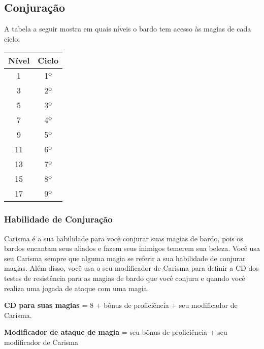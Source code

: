 \begin{multicols}{2}
\section*{Conjuração}%

A tabela a seguir mostra em quais níveis o bardo tem acesso às magias de cada
ciclo:

\begin{center}
\begin{tabular}{|||c||c|||}
    \hline
    \textbf{Nível} & \textbf{Ciclo} \\
    \hline
    1 & 1º \\
    \hline
    3 & 2º \\
    \hline
    5 & 3º \\
    \hline
    7 & 4º \\
    \hline
    9 & 5º \\
    \hline
    11 & 6º \\
    \hline
    13 & 7º \\
    \hline
    15 & 8º \\
    \hline
    17 & 9º \\
    \hline
\end{tabular}
\end{center}

\subsubsection*{Habilidade de Conjuração}%

Carisma é a sua habilidade para você conjurar suas magias de bardo, pois os
bardos encantam seus aliados e fazem seus inimigos temerem sua beleza.
Você usa seu Carisma sempre que alguma magia se referir a sua habilidade de
conjurar magias. Além disso, você usa o seu modificador de Carisma para definir
a CD dos testes de resistência para as magias de bardo que você conjura e
quando você realiza uma jogada de ataque com uma magia.

\begin{center}
\textbf{CD para suas magias} = 8 + bônus de proficiência + seu modificador de
Carisma. \nl

\textbf{Modificador de ataque de magia} = seu bônus de proficiência + seu
modificador de Carisma
\end{center}

\end{multicols}
